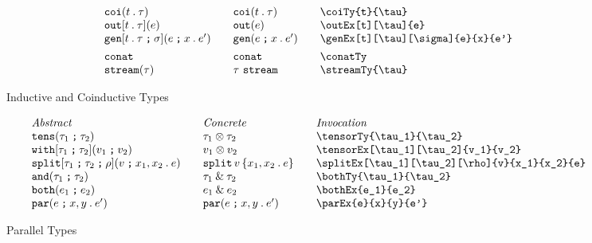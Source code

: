 \documentclass[11pt]{article}
\begin{document}
\begin{figure}
\begin{small}
\begin{displaymath}
\begin{array}{l@{\qquad}l@{\qquad}l@{\qquad}l}
        \coiTy{t}{\tau}                      & \coiTy*{t}{\tau}                    & \verb|\coiTy{t}{\tau}|                         \\
        \outEx[t][\tau]{e}                   & \outEx*{e}                          & \verb|\outEx[t][\tau]{e}|                      \\
        \genEx[t][\tau][\sigma]{e}{x}{e'}    & \genEx*{e}{x}{e'}                   & \verb|\genEx[t][\tau][\sigma]{e}{x}{e'}|       \\[1ex]

        \conatTy                             & \conatTy*                           & \verb|\conatTy|                                \\
        \streamTy{\tau}                      & \streamTy*{\tau}                    & \verb|\streamTy{\tau}|
      \end{array}
    \end{displaymath}
  \end{small}

  \caption{Inductive and Coinductive Types}
  \label{fig:icoi}
\end{figure}

\begin{figure}

  \begin{small}
    \begin{displaymath}
      \begin{array}{l@{\qquad}l@{\qquad}l@{\qquad}l}
        \textit{Abstract} & \textit{Concrete} & \textit{Invocation} \\
        \tensorTy{\tau_1}{\tau_2}                      & \tensorTy*{\tau_1}{\tau_2} & \verb|\tensorTy{\tau_1}{\tau_2}|                      \\
        \tensorEx[\tau_1][\tau_2]{v_1}{v_2}                            & \tensorEx*{v_1}{v_2}       & \verb|\tensorEx[\tau_1][\tau_2]{v_1}{v_2}|                            \\
        \splitEx[\tau_1][\tau_2][\rho]{v}{x_1}{x_2}{e} & \splitEx*{v}{x_1}{x_2}{e}  & \verb|\splitEx[\tau_1][\tau_2][\rho]{v}{x_1}{x_2}{e}| \\
        \bothTy{\tau_1}{\tau_2}                        & \bothTy*{\tau_1}{\tau_2}   & \verb|\bothTy{\tau_1}{\tau_2}|                        \\
        \bothEx{e_1}{e_2}                              & \bothEx*{e_1}{e_2}         & \verb|\bothEx{e_1}{e_2}|                              \\
        \parEx{e}{x}{y}{e'}                            & \parEx*{e}{x}{y}{e'}       & \verb|\parEx{e}{x}{y}{e'}|
      \end{array}
    \end{displaymath}
  \end{small}

  \caption{Parallel Types}
  \label{fig:par}
\end{figure}
\end{document}

